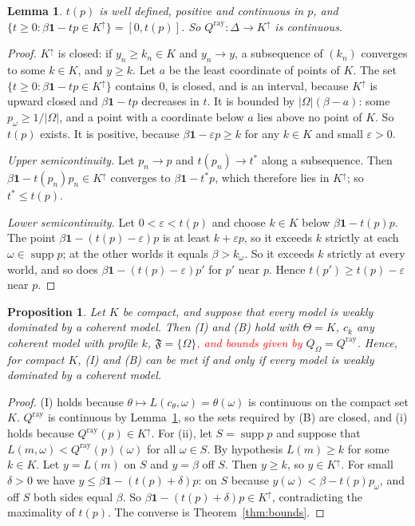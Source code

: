 \documentclass[11pt]{article}
\newtheorem{lemma}[theorem]{Lemma}
\newtheorem{proposition}[theorem]{Proposition}
\theoremstyle{definition}
\theoremstyle{remark}
\newcommand{\F}{\mathfrak F}
\newcommand{\one}{\mathbf 1}
\newcommand{\supp}{\operatorname{supp}}
\begin{document}
\begin{lemma}\label{lem:ray}
$t(p)$ is well defined, positive and continuous in $p$, and $\{t\ge0:\beta\one-tp\in K^\uparrow\}=[0,t(p)]$. So $Q^{\mathrm{ray}}:\Delta\to K^\uparrow$ is continuous.
\end{lemma}
\begin{proof}
$K^\uparrow$ is closed: if $y_n\ge k_n\in K$ and $y_n\to y$, a subsequence of $(k_n)$ converges to some $k\in K$, and $y\ge k$. Let $a$ be the least coordinate of points of $K$. The set $\{t\ge0:\beta\one-tp\in K^\uparrow\}$ contains $0$, is closed, and is an interval, because $K^\uparrow$ is upward closed and $\beta\one-tp$ decreases in $t$. It is bounded by $|\Omega|(\beta-a)$: some $p_\omega\ge1/|\Omega|$, and a point with a coordinate below $a$ lies above no point of $K$. So $t(p)$ exists. It is positive, because $\beta\one-\varepsilon p\ge k$ for any $k\in K$ and small $\varepsilon>0$.

\emph{Upper semicontinuity.} Let $p_n\to p$ and $t(p_n)\to t^*$ along a subsequence. Then $\beta\one-t(p_n)p_n\in K^\uparrow$ converges to $\beta\one-t^*p$, which therefore lies in $K^\uparrow$; so $t^*\le t(p)$.

\emph{Lower semicontinuity.} Let $0<\varepsilon<t(p)$ and choose $k\in K$ below $\beta\one-t(p)p$. The point $\beta\one-(t(p)-\varepsilon)p$ is at least $k+\varepsilon p$, so it exceeds $k$ strictly at each $\omega\in\supp p$; at the other worlds it equals $\beta>k_\omega$. So it exceeds $k$ strictly at every world, and so does $\beta\one-(t(p)-\varepsilon)p'$ for $p'$ near $p$. Hence $t(p')\ge t(p)-\varepsilon$ near $p$.
\end{proof}

\begin{proposition}\label{prop:necessary}
Let $K$ be compact, and suppose that every model is weakly dominated by a coherent model. Then (I) and (B) hold with $\Theta=K$, $c_k$ any coherent model with profile $k$, $\F=\{\Omega\}$\textcolor{red}{, and bounds given by} $Q_\Omega=Q^{\mathrm{ray}}$. Hence, for compact $K$, (I) and (B) can be met if and only if every model is weakly dominated by a coherent model.
\end{proposition}
\begin{proof}
(I) holds because $\theta\mapsto L(c_\theta,\omega)=\theta(\omega)$ is continuous on the compact set $K$. $Q^{\mathrm{ray}}$ is continuous by Lemma~\ref{lem:ray}, so the sets required by (B) are closed, and (i) holds because $Q^{\mathrm{ray}}(p)\in K^\uparrow$. For (ii), let $S=\supp p$ and suppose that $L(m,\omega)<Q^{\mathrm{ray}}(p)(\omega)$ for all $\omega\in S$. By hypothesis $L(m)\ge k$ for some $k\in K$. Let $y=L(m)$ on $S$ and $y=\beta$ off $S$. Then $y\ge k$, so $y\in K^\uparrow$. For small $\delta>0$ we have $y\le \beta\one-(t(p)+\delta)p$: on $S$ because $y(\omega)<\beta-t(p)p_\omega$, and off $S$ both sides equal $\beta$. So $\beta\one-(t(p)+\delta)p\in K^\uparrow$, contradicting the maximality of $t(p)$. The converse is Theorem~\ref{thm:bounds}.
\end{proof}
\end{document}

